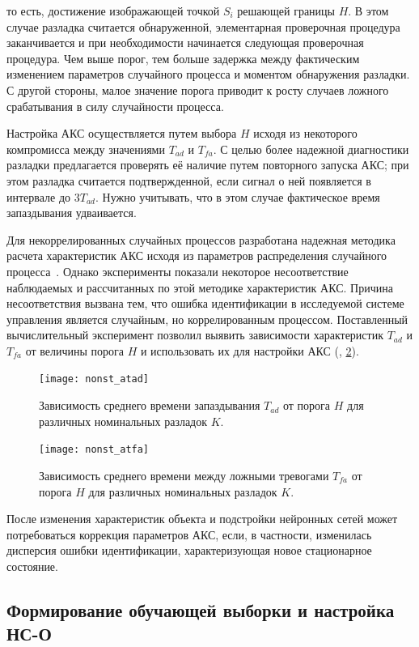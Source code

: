 \noindent то есть, достижение изображающей точкой $S_i$ решающей
границы $H$.  В этом случае разладка считается обнаруженной,
элементарная проверочная процедура заканчивается и при необходимости
начинается следующая проверочная процедура.  Чем выше порог, тем
больше задержка между фактическим изменением параметров случайного
процесса и моментом обнаружения разладки.  С другой стороны, малое
значение порога приводит к росту случаев ложного срабатывания в силу
случайности процесса.

Настройка АКС осуществляется путем выбора $H$ исходя из некоторого
компромисса между значениями $T_{ad}$ и $T_{fa}$.  С целью более
надежной диагностики разладки предлагается проверять её наличие путем
повторного запуска АКС; при этом разладка считается подтвержденной,
если сигнал о ней появляется в интервале до $3T_{ad}$.  Нужно
учитывать, что в этом случае фактическое время запаздывания
удваивается.

Для некоррелированных случайных процессов разработана надежная
методика расчета характеристик АКС исходя из параметров распределения
случайного процесса~\cite{filatov83}.  Однако эксперименты показали
некоторое несоответствие наблюдаемых и рассчитанных по этой методике
характеристик АКС.  Причина несоответствия вызвана тем, что ошибка
идентификации в исследуемой системе управления является случайным, но
коррелированным процессом.  Поставленный вычислительный эксперимент
позволил выявить зависимости характеристик $T_{ad}$ и $T_{fa}$ от
величины порога $H$ и использовать их для настройки АКС
(, \ref{fig:nonst_atfa}).

\begin{figure}[h]
\centering
\texttt{[image: nonst\_atad]}
\caption{Зависимость среднего времени запаздывания $T_{ad}$ от порога
  $H$ для различных номинальных разладок $K$.}
\label{fig:nonst_atad}
\end{figure}

\begin{figure}[h]
\centering
\texttt{[image: nonst\_atfa]}
\caption{Зависимость среднего времени между ложными тревогами $T_{fa}$
  от порога $H$ для различных номинальных разладок $K$.}
\label{fig:nonst_atfa}
\end{figure}

После изменения характеристик объекта и подстройки нейронных сетей
может потребоваться коррекция параметров АКС, если, в частности,
изменилась дисперсия ошибки идентификации, характеризующая новое
стационарное состояние.

\subsection{Формирование обучающей выборки и настройка НС-О}

